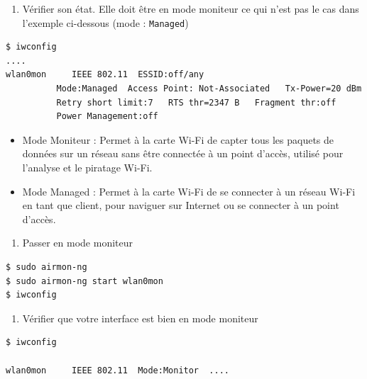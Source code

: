 \documentclass[french, 12pt]{article}%
\newcommand{\itemE}{\item[$\bullet$]}
\newcommand{\titreencadre}{Titre}
\newenvironment{encadre}[1]{\renewcommand{\titreencadre}{#1}
	\begin{mdframed}[style=encadrestyle]
	\vspace{0.5\baselineskip}
	}{%
	\end{mdframed}}
\newif\ifPROF
\begin{document}
\begin{enumerate}[resume]
\item Vérifier son état. Elle doit être en mode moniteur ce qui n'est pas le cas dans l'exemple ci-dessous (mode : \verb?Managed?)
\end{enumerate}

\begin{lstlisting}[style=commande]
$ iwconfig
....
wlan0mon     IEEE 802.11  ESSID:off/any  
          Mode:Managed  Access Point: Not-Associated   Tx-Power=20 dBm   
          Retry short limit:7   RTS thr=2347 B   Fragment thr:off
          Power Management:off
\end{lstlisting}    




\begin{encadre}{Mode moniteur / Managed}
\begin{itemize}
\itemE Mode Moniteur : Permet à la carte Wi-Fi de capter tous les paquets de données sur un réseau sans être connectée à un point d'accès, utilisé pour l'analyse et le piratage Wi-Fi.
\itemE  Mode Managed : Permet à la carte Wi-Fi de se connecter à un réseau Wi-Fi en tant que client, pour naviguer sur Internet ou se connecter à un point d'accès.
\end{itemize}
\end{encadre}



\begin{enumerate}[resume]
\item Passer en mode moniteur
\end{enumerate}
\begin{lstlisting}[style=commande]
$ sudo airmon-ng
$ sudo airmon-ng start wlan0mon
$ iwconfig
\end{lstlisting} 

\begin{enumerate}[resume]
\item Vérifier que votre interface est bien en mode moniteur 
\end{enumerate}
\begin{lstlisting}[style=commande]
$ iwconfig

wlan0mon     IEEE 802.11  Mode:Monitor  ....
\end{lstlisting}

\ifPROF
\color{red}
Autre méthode pour le mode moniteur
\begin{lstlisting}[style=commande]
$ sudo ip link set wlan0mon down
$ sudo ip link set wlan0mon type monitor
$ sudo ip link set wlan0mon up
$ iwconfig
\end{lstlisting} 
\normalcolor
\fi
\end{document}
